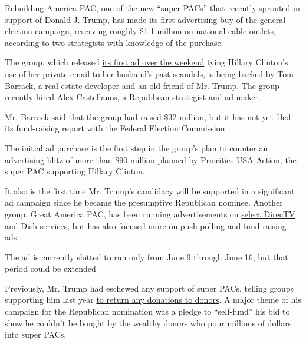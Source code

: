 Rebuilding America PAC, one of the
\href{http://www.nytimes.com/aponline/2016/06/03/us/politics/ap-us-gop-2016-trump-money.html}{new
``super PACs'' that recently sprouted in support of Donald J. Trump},
has made its first advertising buy of the general election campaign,
reserving roughly \$1.1 million on national cable outlets, according to
two strategists with knowledge of the purchase.

The group, which released
\href{https://www.youtube.com/watch?v=9t54Ly_mvuk}{its first ad over the
weekend} tying Hillary Clinton's use of her private email to her
husband's past scandals, is being backed by Tom Barrack, a real estate
developer and an old friend of Mr. Trump. The group
\href{http://www.nytimes.com/2016/06/06/us/politics/trump-super-pac-alex-castellanos.html}{recently
hired Alex Castellanos}, a Republican strategist and ad maker.

Mr. Barrack said that the group had
\href{http://www.wsj.com/articles/real-estate-investor-tom-barrack-raised-32-million-for-super-pac-backing-donald-trump-1464924565?tesla=y}{raised
\$32 million}, but it has not yet filed its fund-raising report with the
Federal Election Commission.

The initial ad purchase is the first step in the group's plan to counter
an advertising blitz of more than \$90 million planned by Priorities USA
Action, the super PAC supporting Hillary Clinton.

It also is the first time Mr. Trump's candidacy will be supported in a
significant ad campaign since he became the presumptive Republican
nominee. Another group, Great America PAC, has been running
advertisements on
\href{http://www.nytimes.com/politics/first-draft/2016/04/06/super-pac-emerges-to-support-donald-trump-who-criticizes-such-groups/?version=meter+at+0\&module=meter-Links\&pgtype=Blogs\&contentId=\&mediaId=\&referrer=https\%3A\%2F\%2Fwww.google.com\%2F\&priority=true\&action=click\&contentCollection=meter-links-click}{select
DirecTV and Dish services}, but has also focused more on push polling
and fund-raising ads.

The ad is currently slotted to run only from June 9 through June 16, but
that period could be extended

Previously, Mr. Trump had eschewed any support of super PACs, telling
groups supporting him last year
\href{https://www.washingtonpost.com/news/post-politics/wp/2015/10/23/donald-trump-tells-super-pacs-supporting-his-candidacy-to-return-all-money-to-donors/}{to
return any donations to donors}. A major theme of his campaign for the
Republican nomination was a pledge to ``self-fund'' his bid to show he
couldn't be bought by the wealthy donors who pour millions of dollars
into super PACs.

